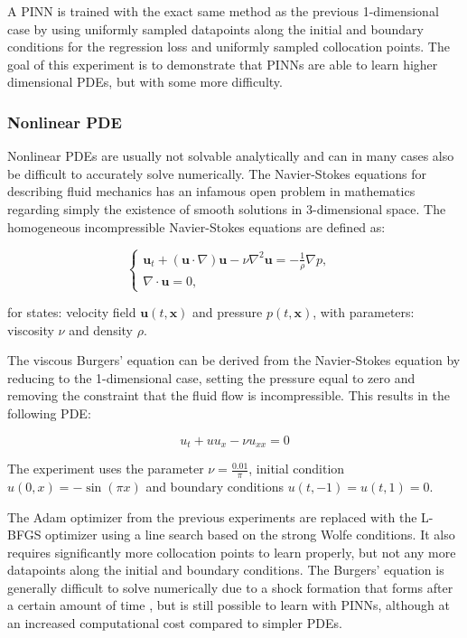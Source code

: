 A PINN is trained with the exact same method as the previous 1-dimensional case by using uniformly sampled datapoints along the initial and boundary conditions for the regression loss and uniformly sampled collocation points. The goal of this experiment is to demonstrate that PINNs are able to learn higher dimensional PDEs, but with some more difficulty.

\subsubsection{Nonlinear PDE}

Nonlinear PDEs are usually not solvable analytically and can in many cases also be difficult to accurately solve numerically. The Navier-Stokes equations for describing fluid mechanics has an infamous open problem in mathematics regarding simply the existence of smooth solutions in 3-dimensional space. The homogeneous incompressible Navier-Stokes equations are defined as:

\begin{equation}
    \begin{cases}
        \bm{u}_t + (\bm{u} \cdot \nabla) \bm{u} - \nu \nabla^2 \bm{u} = - \frac{1}{\rho} \nabla p, & \\
        \nabla \cdot \bm{u} = 0, & 
    \end{cases}
\end{equation}

\noindent for states: velocity field $\bm{u}(t, \bm{x})$ and pressure $p(t, \bm{x})$, with parameters: viscosity $\nu$ and density $\rho$.

The viscous Burgers' equation can be derived from the Navier-Stokes equation by reducing to the 1-dimensional case, setting the pressure equal to zero and removing the constraint that the fluid flow is incompressible. This results in the following PDE:

\begin{equation}
    u_t + u u_x - \nu u_{xx} = 0
\end{equation}

The experiment uses the parameter $\nu = \frac{0.01}{\pi}$, initial condition $u(0, x) = - \sin(\pi x)$ and boundary conditions $u(t, -1) = u(t, 1) = 0$.

The Adam optimizer from the previous experiments are replaced with the L-BFGS optimizer using a line search based on the strong Wolfe conditions. It also requires significantly more collocation points to learn properly, but not any more datapoints along the initial and boundary conditions. The Burgers' equation is generally difficult to solve numerically due to a shock formation that forms after a certain amount of time \cite{pinn1}, but is still possible to learn with PINNs, although at an increased computational cost compared to simpler PDEs.


